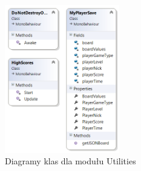\documentclass[a4paper, 11pt]{article}
\begin{document}
\begin{figure}[H]
	\centering
	\includegraphics[width=5cm]{diagramy/class_util.png}
	\caption{Diagramy klas dla modułu Utilities}
	\label{fig:class_util}
\end{figure}
\newpage
\end{document}

